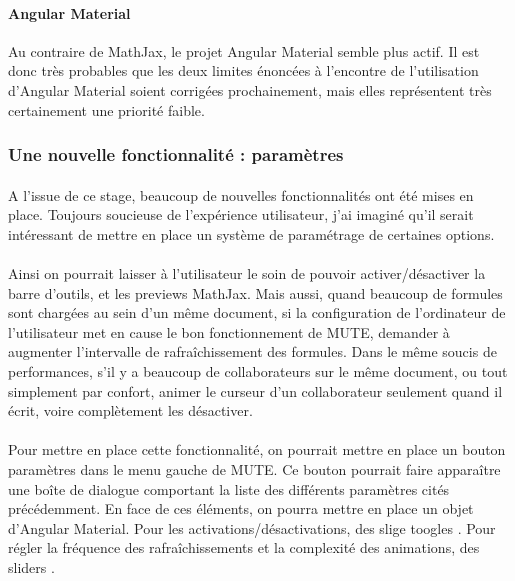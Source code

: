 \documentclass[12pt]{article}
\begin{document}
\paragraph{Angular Material}
Au contraire de MathJax, le projet Angular Material semble plus actif. Il est donc très probables que les deux limites énoncées à l'encontre de l'utilisation d'Angular Material soient corrigées prochainement, mais elles représentent très certainement une priorité faible.

\subsubsection{Une nouvelle fonctionnalité : paramètres}
\paragraph{}
A l'issue de ce stage, beaucoup de nouvelles fonctionnalités ont été mises en place. Toujours soucieuse de l'expérience utilisateur, j'ai imaginé qu'il serait intéressant de mettre en place un système de paramétrage de certaines options.
\paragraph{}
Ainsi on pourrait laisser à l'utilisateur le soin de pouvoir activer/désactiver la barre d'outils, et les previews MathJax. Mais aussi, quand beaucoup de formules sont chargées au sein d'un même document, si la configuration de l'ordinateur de l'utilisateur met en cause le bon fonctionnement de MUTE, demander à augmenter l'intervalle de rafraîchissement des formules. Dans le même soucis de performances, s'il y a beaucoup de collaborateurs sur le même document, ou tout simplement par confort, animer le curseur d'un collaborateur seulement quand il écrit, voire complètement les désactiver.
\paragraph{}
Pour mettre en place cette fonctionnalité, on pourrait mettre en place un bouton paramètres dans le menu gauche de MUTE. Ce bouton pourrait faire apparaître une boîte de dialogue comportant la liste des différents paramètres cités précédemment. En face de ces éléments, on pourra mettre en place un objet d'Angular Material. Pour les activations/désactivations, des slige toogles \cite{slide}. Pour régler la fréquence des rafraîchissements et la complexité des animations, des sliders \cite{slider}.\\
\end{document}
